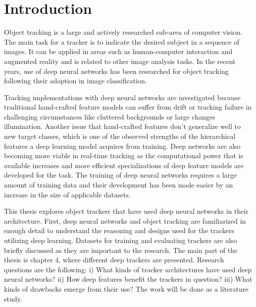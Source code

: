 \section{Introduction}
Object tracking is a large and actively researched sub-area of computer vision. The
main task for a tracker is to indicate the desired subject in a sequence of images.
It can be applied in areas such as human-computer interaction and augmented reality
and is related to other image analysis tasks. In the recent years, use of deep neural
networks has been researched for object tracking following their adoption in image
classification.

Tracking implementations with deep neural networks are investigated because traditional
hand-crafted feature models can suffer from drift or tracking failure in challenging
circumstances like cluttered backgrounds or large changes illumination. Another issue
that hand-crafted features don’t generalize well to new target classes, which is one
of the observed strengths of the hierarchical features a deep learning model acquires
from training. Deep networks are also becoming more viable in real-time tracking as
the computational power that is available increases and more efficient specializations
of deep feature models are developed for the task. The training of deep neural networks
requires a large amount of training data and their development has been made easier by
an increase in the size of applicable datasets.

This thesis explores object trackers that have used deep neural networks in their
architecture. First, deep neural networks and object tracking are familiarized in
enough detail to understand the reasoning and designs used for the trackers utilizing
deep learning. Datasets for training and evaluating trackers are also briefly discussed
as they are important to the research. The main part of the thesis is chapter 4, where
different deep trackers are presented. Research questions are the following: i) What
kinds of tracker architectures have used deep neural networks? ii) How deep features
benefit the trackers in question? iii) What kinds of drawbacks emerge from their use?
The work will be done as a literature study.
